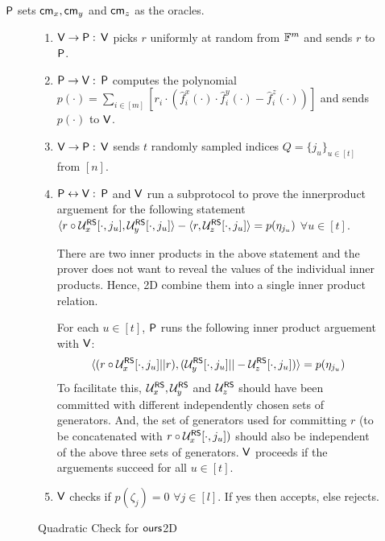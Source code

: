 	$\mathsf{P}$ sets $\mathsf{cm}_x, \mathsf{cm}_y$ and $\mathsf{cm}_z$ as the oracles.
	\begin{figure}[h!]
		\begin{framed}
\begin{enumerate}
	\item $\mathsf{V} \rightarrow \mathsf{P}: $ $\mathsf{V}$ picks $r$ uniformly at random from $\mathbb{F}^{m}$ and sends $r$ to $\mathsf{P}$.
	
	\item $\mathsf{P} \rightarrow \mathsf{V}: $ $\mathsf{P}$ computes the polynomial $p(\cdot)= \sum_{i\in [m]} [r_i\cdot (\hat{f}^x_i(\cdot)\cdot \hat{f}^y_i(\cdot) - \hat{f}^z_i(\cdot))] $ and sends $p(\cdot)$ to $\mathsf{V}$. 
	
	\item $\mathsf{V} \rightarrow \mathsf{P}: $ $\mathsf{V}$ sends $t$ randomly sampled indices $Q=\{j_u\}_{u\in[t]}$ from $[n]$.
	
	\item $\mathsf{P} \leftrightarrow \mathsf{V}: $ $\mathsf{P}$ and $\mathsf{V}$ run a subprotocol to prove the innerproduct arguement for the following statement $\langle r\circ \mathcal{U}^{\mathsf{RS}}_x[\cdot,j_u],\mathcal{U}^{\mathsf{RS}}_y[\cdot,j_u]\rangle - \langle r,\mathcal{U}^{\mathsf{RS}}_z[\cdot,j_u]\rangle = p(\eta_{j_u})$ $\forall u\in[t]$. 
	
	There are two inner products in the above statement and the prover does not want to reveal the values of the individual inner products. Hence, \name2D combine them into a single inner product relation.
	
	For each $u\in[t]$, $\mathsf{P}$ runs the following inner product arguement with $\mathsf{V}$:
	$$\langle (r\circ \mathcal{U}^{\mathsf{RS}}_x[\cdot,j_u]||r),(\mathcal{U}^{\mathsf{RS}}_y[\cdot,j_u]||-\mathcal{U}^{\mathsf{RS}}_z[\cdot,j_u])\rangle = p(\eta_{j_u})$$
	To facilitate this, $\mathcal{U}^{\mathsf{RS}}_x, \mathcal{U}^{\mathsf{RS}}_y$ and $\mathcal{U}^{\mathsf{RS}}_z$ should have been committed with different independently chosen sets of generators. And, the set of generators used for committing $r$ (to be concatenated with $r \circ \mathcal{U}^{\mathsf{RS}}_x [\cdot, j_u])$ should also be independent of the above three sets of generators. $\mathsf{V}$ proceeds if the arguements succeed for all $u\in[t]$.
	
	\item $\mathsf{V}$ checks if $p(\zeta_j)=0$ $\forall j\in[l]$. If yes then accepts, else rejects.
\end{enumerate}
\end{framed}
\caption{Quadratic Check for $\textsf{ours}$2D}
\end{figure}


